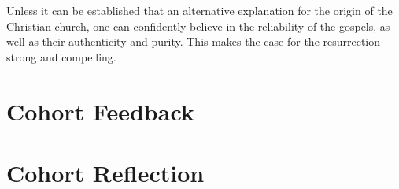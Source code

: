 \documentclass[12pt]{turabian-researchpaper}
\begin{document}
Unless it can be established that an alternative explanation for the origin of the Christian church, one can confidently believe in the reliability of the gospels, as well as their authenticity and purity. This makes the case for the resurrection strong and compelling.



\section{Cohort Feedback}

\section{Cohort Reflection}


\newpage
\printbibliography
\end{document}
